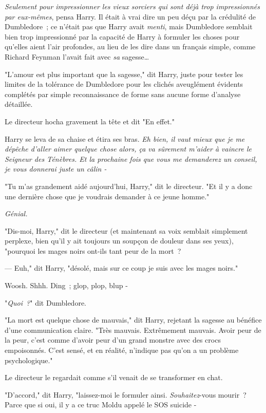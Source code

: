 \emph{Seulement pour impressionner les vieux sorciers qui sont déjà trop impressionnés par eux-mêmes}, pensa Harry. Il était à vrai dire un peu déçu par la crédulité de Dumbledore~; ce n'était pas que Harry avait \emph{menti}, mais Dumbledore semblait bien trop impressionné par la capacité de Harry à formuler les choses pour qu'elles aient l'air profondes, au lieu de les dire dans un français simple, comme Richard Feynman l'avait fait avec \emph{sa} sagesse…

"L'amour est plus important que la sagesse," dit Harry, juste pour tester les limites de la tolérance de Dumbledore pour les clichés aveuglément évidents complétés par simple reconnaissance de forme sans aucune forme d'analyse détaillée.

Le directeur hocha gravement la tête et dit "En effet."

Harry se leva de sa chaise et étira ses bras. \emph{Eh bien, il vaut mieux que je me dépêche d'aller aimer quelque chose alors, ça va sûrement m'aider à vaincre le Seigneur des Ténèbres. Et la prochaine fois que vous me demanderez un conseil, je vous donnerai juste un câlin -}

"Tu m'as grandement aidé aujourd'hui, Harry," dit le directeur. "Et il y a donc une dernière chose que je voudrais demander à ce jeune homme."

\emph{Génial.}

"Dis-moi, Harry," dit le directeur (et maintenant sa voix semblait simplement perplexe, bien qu'il y ait toujours un soupçon de douleur dans ses yeux), "pourquoi les mages noirs ont-ils tant peur de la mort~?

--- Euh," dit Harry, "désolé, mais sur ce coup je suis avec les mages noirs."

Woosh. Shhh. Ding~; glop, plop, blup -

"\emph{Quoi~?}" dit Dumbledore.

"La mort est quelque chose de mauvais," dit Harry, rejetant la sagesse au bénéfice d'une communication claire. "Très mauvais. Extrêmement mauvais. Avoir peur de la peur, c'est comme d'avoir peur d'un grand monstre avec des crocs empoisonnés. C'est sensé, et en réalité, n'indique pas qu'on a un problème psychologique."

Le directeur le regardait comme s'il venait de se transformer en chat.

"D'accord," dit Harry, "laissez-moi le formuler ainsi. \emph{Souhaitez}-vous mourir~? Parce que si oui, il y a ce truc Moldu appelé le SOS suicide -

